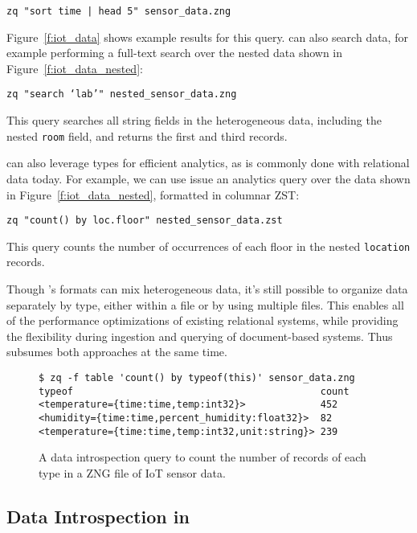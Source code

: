 \texttt{zq "sort time | head 5" sensor\_data.zng}

\noindent{}Figure~\ref{f:iot_data} shows example results for this query. \sys{} can also search data, for example performing a full-text search over the nested data shown in Figure~\ref{f:iot_data_nested}:

\texttt{zq "search `lab'" nested\_sensor\_data.zng}

\noindent{}This query searches all string fields in the heterogeneous data, including the nested \texttt{room} field, and returns the first and third records.

\sys{} can also leverage types for efficient analytics, as is commonly done with relational data today. For example, we can use issue an analytics query over the data shown in Figure~\ref{f:iot_data_nested}, formatted in columnar ZST:

\texttt{zq "count() by loc.floor" nested\_sensor\_data.zst}

\noindent{}This query counts the number of occurrences of each floor in the nested \texttt{location} records.

Though \sys{}'s formats can mix heterogeneous data, it's still possible to organize data separately by type, either within a file or by using multiple files. This enables all of the performance optimizations of existing relational systems, while providing the flexibility during ingestion and querying of document-based systems. Thus \sys{} subsumes both approaches at the same time.



\begin{figure}
    \begin{verbatim}
$ zq -f table 'count() by typeof(this)' sensor_data.zng
typeof                                           count
<temperature={time:time,temp:int32}>             452
<humidity={time:time,percent_humidity:float32}>  82
<temperature={time:time,temp:int32,unit:string}> 239
    \end{verbatim}
    \vspace{-1.3em}
    \caption{A data introspection query to count the number of records of each type in a ZNG file of IoT sensor data. }
    \label{f:count_by_type}
    \vspace{-1.5em}
\end{figure}

\vspace{-0.9em}
\subsection{Data Introspection in \sys{}} \label{ss:zed_in_action_types}

